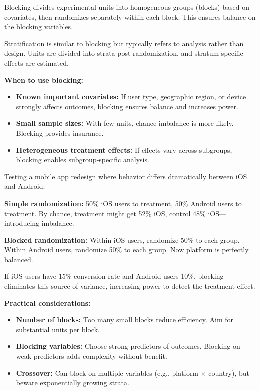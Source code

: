 \begin{definition}[Blocking]
Blocking divides experimental units into homogeneous groups (blocks) based on covariates, then randomizes separately within each block. This ensures balance on the blocking variables.
\end{definition}

\begin{definition}[Stratification]
Stratification is similar to blocking but typically refers to analysis rather than design. Units are divided into strata post-randomization, and stratum-specific effects are estimated.
\end{definition}

\textbf{When to use blocking:}

\begin{itemize}
    \item \textbf{Known important covariates:} If user type, geographic region, or device strongly affects outcomes, blocking ensures balance and increases power.

    \item \textbf{Small sample sizes:} With few units, chance imbalance is more likely. Blocking provides insurance.

    \item \textbf{Heterogeneous treatment effects:} If effects vary across subgroups, blocking enables subgroup-specific analysis.
\end{itemize}

\begin{example}
Testing a mobile app redesign where behavior differs dramatically between iOS and Android:

\textbf{Simple randomization:} 50\% iOS users to treatment, 50\% Android users to treatment. By chance, treatment might get 52\% iOS, control 48\% iOS—introducing imbalance.

\textbf{Blocked randomization:} Within iOS users, randomize 50\% to each group. Within Android users, randomize 50\% to each group. Now platform is perfectly balanced.

If iOS users have 15\% conversion rate and Android users 10\%, blocking eliminates this source of variance, increasing power to detect the treatment effect.
\end{example}

\textbf{Practical considerations:}

\begin{itemize}
    \item \textbf{Number of blocks:} Too many small blocks reduce efficiency. Aim for substantial units per block.

    \item \textbf{Blocking variables:} Choose strong predictors of outcomes. Blocking on weak predictors adds complexity without benefit.

    \item \textbf{Crossover:} Can block on multiple variables (e.g., platform × country), but beware exponentially growing strata.
\end{itemize}

